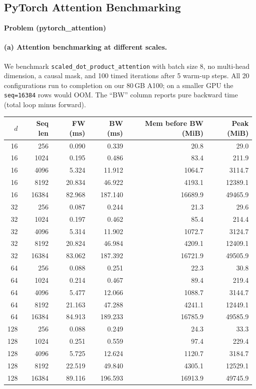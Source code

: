 \documentclass[11pt]{article}
\begin{document}
\subsection{PyTorch Attention Benchmarking}
\textbf{Problem (pytorch\_attention)}

\paragraph{(a) Attention benchmarking at different scales.}

We benchmark \texttt{scaled\_dot\_product\_attention} with batch size 8,
no multi-head dimension, a causal mask, and 100 timed iterations after 5
warm-up steps.  All 20 configurations run to completion on our 80\,GB
A100; on a smaller GPU the \texttt{seq=16384} rows would OOM.
The ``BW'' column reports pure backward time (total loop minus forward).

\begin{center}
\small
\begin{tabular}{r r r r r r}
\toprule
$d$ & Seq len & FW (ms) & BW (ms) & Mem before BW (MiB) & Peak (MiB) \\
\midrule
16 & 256   &  0.090 &  0.339 &      20.8 &      29.0 \\
16 & 1024  &  0.195 &  0.486 &      83.4 &     211.9 \\
16 & 4096  &  5.324 & 11.912 &    1064.7 &    3114.7 \\
16 & 8192  & 20.834 & 46.922 &    4193.1 &   12389.1 \\
16 & 16384 & 82.968 &187.140 &   16689.9 &   49465.9 \\
\midrule
32 & 256   &  0.087 &  0.244 &      21.3 &      29.6 \\
32 & 1024  &  0.197 &  0.462 &      85.4 &     214.4 \\
32 & 4096  &  5.314 & 11.902 &    1072.7 &    3124.7 \\
32 & 8192  & 20.824 & 46.984 &    4209.1 &   12409.1 \\
32 & 16384 & 83.062 &187.392 &   16721.9 &   49505.9 \\
\midrule
64 & 256   &  0.088 &  0.251 &      22.3 &      30.8 \\
64 & 1024  &  0.214 &  0.467 &      89.4 &     219.4 \\
64 & 4096  &  5.477 & 12.066 &    1088.7 &    3144.7 \\
64 & 8192  & 21.163 & 47.288 &    4241.1 &   12449.1 \\
64 & 16384 & 84.913 &189.233 &   16785.9 &   49585.9 \\
\midrule
128 & 256   &  0.088 &  0.249 &      24.3 &      33.3 \\
128 & 1024  &  0.251 &  0.559 &      97.4 &     229.4 \\
128 & 4096  &  5.725 & 12.624 &    1120.7 &    3184.7 \\
128 & 8192  & 22.519 & 49.840 &    4305.1 &   12529.1 \\
128 & 16384 & 89.116 &196.593 &   16913.9 &   49745.9 \\
\bottomrule
\end{tabular}
\end{center}
\end{document}
